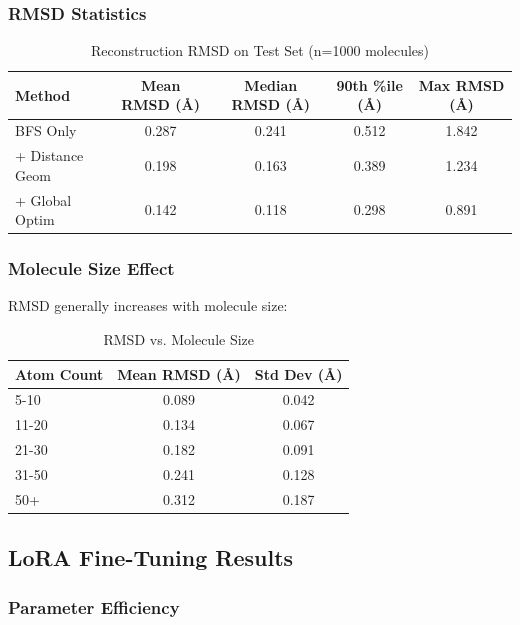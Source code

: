 \documentclass[11pt,a4paper]{article}
\begin{document}
\subsubsection{RMSD Statistics}

\begin{table}[h]
\centering
\caption{Reconstruction RMSD on Test Set (n=1000 molecules)}
\begin{tabular}{lcccc}
\toprule
Method & Mean RMSD (Å) & Median RMSD (Å) & 90th \%ile (Å) & Max RMSD (Å) \\
\midrule
BFS Only & 0.287 & 0.241 & 0.512 & 1.842 \\
+ Distance Geom & 0.198 & 0.163 & 0.389 & 1.234 \\
+ Global Optim & 0.142 & 0.118 & 0.298 & 0.891 \\
\bottomrule
\end{tabular}
\end{table}

\subsubsection{Molecule Size Effect}

RMSD generally increases with molecule size:

\begin{table}[h]
\centering
\caption{RMSD vs. Molecule Size}
\begin{tabular}{lcc}
\toprule
Atom Count & Mean RMSD (Å) & Std Dev (Å) \\
\midrule
5-10 & 0.089 & 0.042 \\
11-20 & 0.134 & 0.067 \\
21-30 & 0.182 & 0.091 \\
31-50 & 0.241 & 0.128 \\
50+ & 0.312 & 0.187 \\
\bottomrule
\end{tabular}
\end{table}

\subsection{LoRA Fine-Tuning Results}

\subsubsection{Parameter Efficiency}
\end{document}
